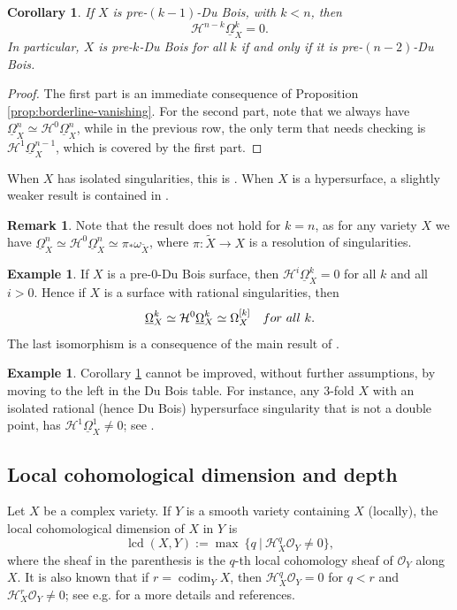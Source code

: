 \documentclass[11pt]{amsart}
\newtheorem{corollary}[equation]{Corollary}
\theoremstyle{definition}
\newtheorem{remark}[equation]{Remark}
\newtheorem{example}[equation]{Example}
\theoremstyle{plain}
\renewcommand{\H}{\mathcal H}
\renewcommand{\O}{\mathcal O}
\newcommand{\DB}{\underline{\Omega}} %
\DeclareMathOperator{\lcd}{lcd}
\DeclareMathOperator{\codim}{codim}
\begin{document}
\begin{corollary}\label{cor:borderline-vanishing}
If $X$ is pre-$(k-1)$-Du Bois, with $k < n$, then
\[\H^{n-k}\DB_X^k=0.\]
In particular, $X$ is pre-$k$-Du Bois for all $k$ if and only if it is pre-$(n-2)$-Du Bois.
\end{corollary}
\begin{proof}
The first part is an immediate consequence of Proposition \ref{prop:borderline-vanishing}. For the second part, note that we always have 
$\DB_X^n \simeq \H^{0}\DB_X^n$, while in the previous row, the only term that needs checking is $\H^{1}\DB_X^{n-1}$, which is covered
 by the first part.
\end{proof}


When $X$ has isolated singularities, this is \cite[Lemma 2.5]{FL-isolated}. When $X$ is a hypersurface, a slightly weaker result is contained in \cite[Theorem 1.4]{MOPW}.

\begin{remark}
Note that the result does not hold for $k = n$, as for any variety $X$ we have 
$\DB_X^n \simeq \H^{0}\DB_X^n \simeq \pi_* \omega_{\widetilde X}$, where 
$\pi \colon \widetilde X \to X$ is a resolution of singularities.
\end{remark}


\begin{example}
If $X$ is a pre-$0$-Du Bois surface, then $\H^i \DB_X^k = 0$ for all $k$ and all $i > 0$. Hence if $X$ is a surface with rational 
singularities, then 
$$\DB_X^k  \simeq \H^0 \DB_X^k\simeq \Omega_X^{[k]} \,\,\,\,\,\,{\rm for~all~}k.$$
The last isomorphism is a consequence of the main result of \cite{KS-extending}.
\end{example}

\begin{example}
Corollary \ref{cor:borderline-vanishing} cannot be improved, without further assumptions, by moving to the left in the Du Bois table. For instance, 
any $3$-fold $X$ with an isolated rational (hence Du Bois) hypersurface singularity that is not a double point, has $\H^{1}\DB_X^1 \neq 0$; see 
\cite[Theorem 2.2]{NS}. 
\end{example}


\subsection{Local cohomological dimension and depth}\label{scn:lcd}
Let $X$ be a complex variety. If $Y$ is a smooth variety containing $X$ (locally), the local cohomological dimension of $X$ in $Y$ is
$$\lcd (X, Y) := \max ~\{q ~|~ \H^q_X \O_Y \neq 0\},$$
where the sheaf in the parenthesis is the $q$-th local cohomology sheaf of $\O_Y$ along $X$. It is also known that if $r = \codim_Y X$, then $\H^q_X \O_Y = 0$ for $q < r$ and $\H^r_X \O_Y \neq 0$; 
see e.g. \cite{MP-LC} for a more details and references. 
\end{document}
